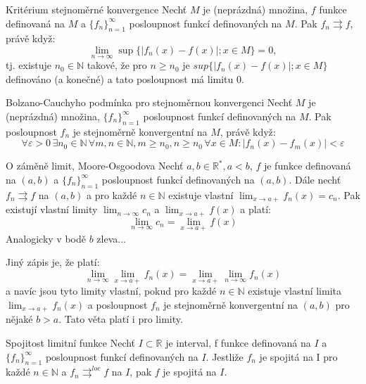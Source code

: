 \begin{vetaN}{Kritérium stejnoměrné konvergence}
Nechť $M$ je (neprázdná) množina, $f$ funkce definovaná na $M$ a $\{f_n\}_{n=1}^{\infty}$ posloupnost funkcí definovaných na $M$. Pak $f_n \rightrightarrows f$, právě když:
$$\lim_{n \rightarrow \infty} \sup\{|f_n(x)-f(x)|; x \in M\} = 0, $$
tj. existuje $n_0 \in \mathbb{N}$ takové, že pro $n \ge n_0$ je $sup\{|f_n(x)-f(x)|; x \in M\}$ definováno (a konečné) a tato posloupnost má limitu 0.
\end{vetaN}

\begin{vetaN}{Bolzano-Cauchyho podmínka pro stejnoměrnou konvergenci}
Nechť $M$ je (neprázdná) množina, $\{f_n\}_{n=1}^{\infty}$ posloupnost funkcí definovaných na $M$. Pak posloupnost $f_n$ je stejnoměrně konvergentní na $M$, právě když:
$$\forall \varepsilon > 0\, \exists n_0 \in \mathbb{N}\, \forall m, n \in \mathbb{N}, m \ge n_0, n \ge n_0\, \forall x \in M: |f_n(x)-f_m(x)| < \varepsilon$$
\end{vetaN}

\begin{vetaN}{O záměně limit, Moore-Osgoodova}
Nechť $a, b \in \mathbb{R}^*, a<b$, $f$ je funkce definovaná na $(a,b)$ a $\{f_n\}_{n=1}^{\infty}$ posloupnost funkcí definovaných na $(a,b)$. Dále nechť $f_n \rightrightarrows f$ na $(a,b)$ a pro každé $n \in \mathbb{N}$ existuje vlastní $\lim_{x \rightarrow a+} f_n(x) = c_n$. Pak existují vlastní limity $\lim_{n \rightarrow \infty} c_n$ a $\lim_{x \rightarrow a+} f(x)$ a platí:
$$\lim_{n \rightarrow \infty} c_n =\lim_{x \rightarrow a+} f(x)$$
Analogicky v bodě $b$ zleva...

\begin{poznamka}
Jiný zápis je, že platí:
$$\lim_{n \rightarrow \infty} \lim_{x \rightarrow a+} f_n(x) = \lim_{x \rightarrow a+} \lim_{n \rightarrow \infty} f_n(x)$$
a navíc jsou tyto limity vlastní, pokud pro každé $n \in \mathbb{N}$ existuje vlastní limita $\lim_{x \rightarrow a+} f_n(x)$ a posloupnost $f_n$ je stejnoměrně konvergentní na $(a,b)$ pro nějaké $b>a$. Tato věta platí i pro  limity.
\end{poznamka}
\end{vetaN}

\begin{vetaN}{Spojitost limitní funkce}
Nechť $I \subset \mathbb{R}$ je interval, f funkce definovaná na $I$ a $\{f_n\}_{n=1}^{\infty}$ posloupnost funkcí definovaných na $I$. Jestliže $f_n$ je spojitá na I pro každé $n \in \mathbb{N}$ a $f_n \rightrightarrows^{loc} f$ na $I$, pak $f$ je spojitá na $I$.
\end{vetaN}

